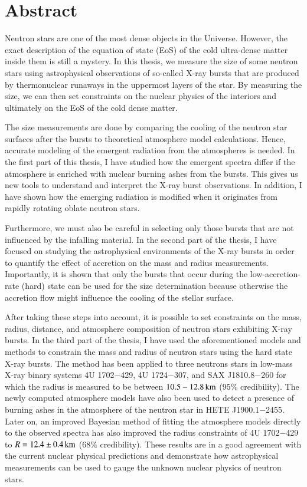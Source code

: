 \chapter*{Abstract}

Neutron stars are one of the most dense objects in the Universe.
However, the exact description of the equation of state (EoS) of the cold ultra-dense matter inside them is still a mystery.
In this thesis, we measure the size of some neutron stars using astrophysical observations of so-called X-ray bursts that are produced by thermonuclear runaways in the uppermost layers of the star.
By measuring the size, we can then set constraints on the nuclear physics of the interiors and ultimately on the EoS of the cold dense matter.

The size measurements are done by comparing the cooling of the neutron star surfaces after the bursts to theoretical atmosphere model calculations.
Hence, accurate modeling of the emergent radiation from the atmospheres is needed.
In the first part of this thesis, I have studied how the emergent spectra differ if the atmosphere is enriched with nuclear burning ashes from the bursts.
This gives us new tools to understand and interpret the X-ray burst observations.
In addition, I have shown how the emerging radiation is modified when it originates from rapidly rotating oblate neutron stars.

Furthermore, we must also be careful in selecting only those bursts that are not influenced by the infalling material.
In the second part of the thesis, I have focused on studying the astrophysical environments of the X-ray bursts in order to quantify the effect of accretion on the mass and radius measurements.
Importantly, it is shown that only the bursts that occur during the low-accretion-rate (hard) state can be used for the size determination because otherwise the accretion flow might influence the cooling of the stellar surface.

After taking these steps into account, it is possible to set constraints on the mass, radius, distance, and atmosphere composition of neutron stars exhibiting X-ray bursts.
In the third part of the thesis, I have used the aforementioned models and methods to constrain the mass and radius of neutron stars using the hard state X-ray bursts.
The method has been applied to three neutrons stars in low-mass X-ray binary systems 4U 1702$-$429, 4U 1724$-$307, and SAX J1810.8$-$260 for which the radius is measured to be between $10.5 - 12.8\, \mathrm{km}$ ($95$\% credibility).
The newly computed atmosphere models have also been used to detect a presence of burning ashes in the atmosphere of the neutron star in HETE J1900.1$-$2455.
Later on, an improved Bayesian method of fitting the atmosphere models directly to the observed spectra has also improved the radius constraints of 4U 1702$-$429 to $R = 12.4 \pm 0.4\, \mathrm{km}$ ($68\%$ credibility). 
These results are in a good agreement with the current nuclear physical predictions and demonstrate how astrophysical measurements can be used to gauge the unknown nuclear physics of neutron stars.


